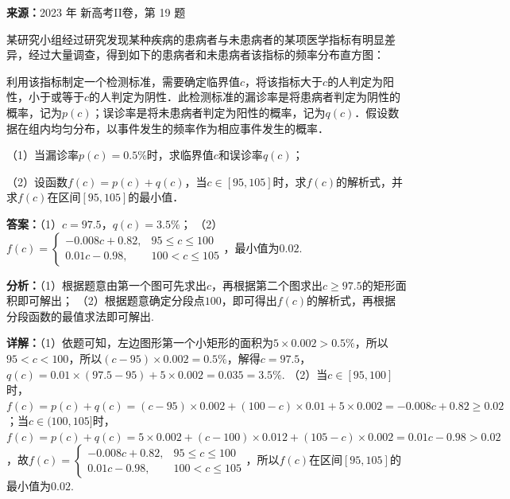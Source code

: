 \begin{question}[points=10]
\textbf{来源：}2023 年 新高考II卷，第 19 题\par
某研究小组经过研究发现某种疾病的患病者与未患病者的某项医学指标有明显差异，经过大量调查，得到如下的患病者和未患病者该指标的频率分布直方图：



利用该指标制定一个检测标准，需要确定临界值$c$，将该指标大于$c$的人判定为阳性，小于或等于$c$的人判定为阴性．此检测标准的漏诊率是将患病者判定为阴性的概率，记为$p(c)$；误诊率是将未患病者判定为阳性的概率，记为$q(c)$．假设数据在组内均匀分布，以事件发生的频率作为相应事件发生的概率．

（1）当漏诊率$p(c)=0.5\%$时，求临界值$c$和误诊率$q(c)$；

（2）设函数$f(c)=p(c)+q(c)$，当$c\in[95,105]$时，求$f(c)$的解析式，并求$f(c)$在区间$[95,105]$的最小值．
\begin{solution}
\textbf{答案：}（1）$c=97.5$，$q(c)=3.5\%$；
（2）$f(c)=\begin{cases}-0.008c+0.82, & 95\le c\le100\\ 0.01c-0.98, & 100<c\le105\end{cases}$，最小值为$0.02$.

\textbf{分析：}（1）根据题意由第一个图可先求出$c$，再根据第二个图求出$c\ge97.5$的矩形面积即可解出；
（2）根据题意确定分段点$100$，即可得出$f(c)$的解析式，再根据分段函数的最值求法即可解出.

\textbf{详解：}（1）依题可知，左边图形第一个小矩形的面积为$5\times0.002>0.5\%$，所以$95<c<100$，所以$(c-95)\times0.002=0.5\%$，解得$c=97.5$，$q(c)=0.01\times(97.5-95)+5\times0.002=0.035=3.5\%$.
（2）当$c\in[95,100]$时，$f(c)=p(c)+q(c)=(c-95)\times0.002+(100-c)\times0.01+5\times0.002=-0.008c+0.82\ge0.02$；当$c\in(100,105]$时，$f(c)=p(c)+q(c)=5\times0.002+(c-100)\times0.012+(105-c)\times0.002=0.01c-0.98>0.02$，故$f(c)=\begin{cases}-0.008c+0.82, & 95\le c\le100\\ 0.01c-0.98, & 100<c\le105\end{cases}$，所以$f(c)$在区间$[95,105]$的最小值为$0.02$.
\end{solution}
\end{question}

